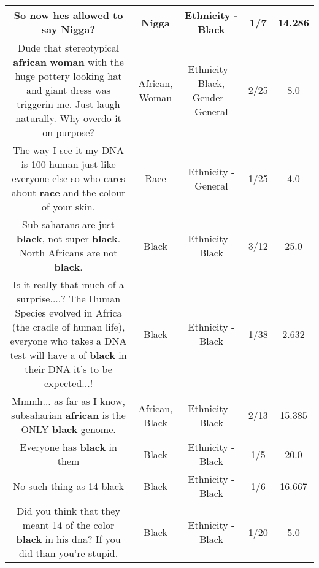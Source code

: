 \documentclass[11pt]{article}
\newlength\mylength
\begin{document}
\begin{center}
\begin{longtable}{|C{.65\mylength}|C{.30\mylength}|C{.12\mylength}|C{.12\mylength}|C{.12\mylength}|}
  \small So now hes allowed to say \textbf{Nigga}?\normalsize   & Nigga & Ethnicity - Black & 1/7 & 14.286 \\  \hline
  \small Dude that stereotypical \textbf{african} \textbf{woman} with the huge pottery looking hat and giant dress was triggerin me. Just laugh naturally. Why overdo it on purpose?\normalsize   & African, Woman & Ethnicity - Black, Gender - General & 2/25 & 8.0 \\  \hline
  \small The way I see it my DNA is 100 human just like everyone else so who cares about \textbf{race} and the colour of your skin.\normalsize   & Race & Ethnicity - General & 1/25 & 4.0 \\  \hline
  \small Sub-saharans are just \textbf{black}, not super \textbf{black}. North Africans are not \textbf{black}.\normalsize   & Black & Ethnicity - Black & 3/12 & 25.0 \\  \hline
  \small Is it really that much of a surprise....? The Human Species evolved in Africa (the cradle of human life), everyone who takes a DNA test will have a  of \textbf{black} in their DNA it's to be expected...!\normalsize   & Black & Ethnicity - Black & 1/38 & 2.632 \\  \hline
  \small Mmmh... as far as I know, subsaharian \textbf{african} is the ONLY \textbf{black} genome.\normalsize   & African, Black & Ethnicity - Black & 2/13 & 15.385 \\  \hline
  \small Everyone has \textbf{black} in them\normalsize   & Black & Ethnicity - Black & 1/5 & 20.0 \\  \hline
  \small No such thing as 14 black\normalsize   & Black & Ethnicity - Black & 1/6 & 16.667 \\  \hline
  \small Did you think that they meant 14 of the color \textbf{black} in his dna? If you did than you're stupid.\normalsize   & Black & Ethnicity - Black & 1/20 & 5.0 \\  \hline

\end{longtable}
\end{center}
\end{document}
